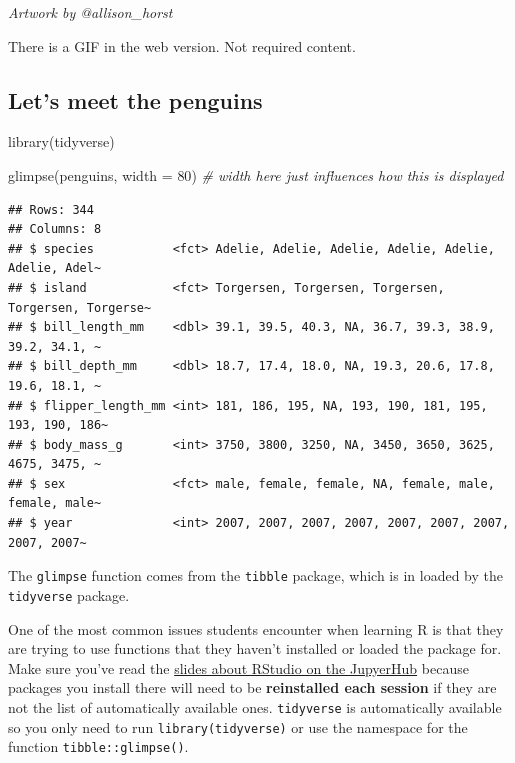 \documentclass[
  openany]{book}
\newenvironment{Shaded}{\begin{snugshade}}{\end{snugshade}}
\newcommand{\AttributeTok}[1]{\textcolor[rgb]{0.77,0.63,0.00}{#1}}
\newcommand{\CommentTok}[1]{\textcolor[rgb]{0.56,0.35,0.01}{\textit{#1}}}
\newcommand{\DecValTok}[1]{\textcolor[rgb]{0.00,0.00,0.81}{#1}}
\newcommand{\FunctionTok}[1]{\textcolor[rgb]{0.00,0.00,0.00}{#1}}
\newcommand{\NormalTok}[1]{#1}
\begin{document}
\emph{Artwork by @allison\_horst}

There is a GIF in the web version. Not required content.

\hypertarget{lets-meet-the-penguins}{%
\subsection{Let's meet the penguins}\label{lets-meet-the-penguins}}

\begin{Shaded}
\begin{Highlighting}[]
\FunctionTok{library}\NormalTok{(tidyverse)}

\FunctionTok{glimpse}\NormalTok{(penguins, }\AttributeTok{width =} \DecValTok{80}\NormalTok{) }\CommentTok{\# width here just influences how this is displayed}
\end{Highlighting}
\end{Shaded}

\begin{verbatim}
## Rows: 344
## Columns: 8
## $ species           <fct> Adelie, Adelie, Adelie, Adelie, Adelie, Adelie, Adel~
## $ island            <fct> Torgersen, Torgersen, Torgersen, Torgersen, Torgerse~
## $ bill_length_mm    <dbl> 39.1, 39.5, 40.3, NA, 36.7, 39.3, 38.9, 39.2, 34.1, ~
## $ bill_depth_mm     <dbl> 18.7, 17.4, 18.0, NA, 19.3, 20.6, 17.8, 19.6, 18.1, ~
## $ flipper_length_mm <int> 181, 186, 195, NA, 193, 190, 181, 195, 193, 190, 186~
## $ body_mass_g       <int> 3750, 3800, 3250, NA, 3450, 3650, 3625, 4675, 3475, ~
## $ sex               <fct> male, female, female, NA, female, male, female, male~
## $ year              <int> 2007, 2007, 2007, 2007, 2007, 2007, 2007, 2007, 2007~
\end{verbatim}

The \texttt{glimpse} function comes from the \texttt{tibble} package, which is in loaded by the \texttt{tidyverse} package.

One of the most common issues students encounter when learning R is that they are trying to use functions that they haven't installed or loaded the package for. Make sure you've read the \href{https://q.utoronto.ca/courses/204826/pages/course-tools\#jupyter}{slides about RStudio on the JupyerHub} because packages you install there will need to be \textbf{reinstalled each session} if they are not the list of automatically available ones.
\texttt{tidyverse} is automatically available so you only need to run \texttt{library(tidyverse)} or use the namespace for the function \texttt{tibble::glimpse()}.
\end{document}
